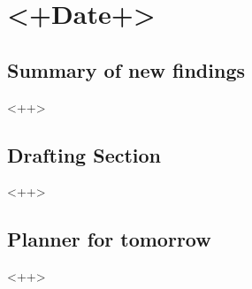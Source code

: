 \section{<+Date+>}

\subsection{Summary of new findings}
<++>


\subsection{Drafting Section}
<++>


\subsection{Planner for tomorrow}
<++>
